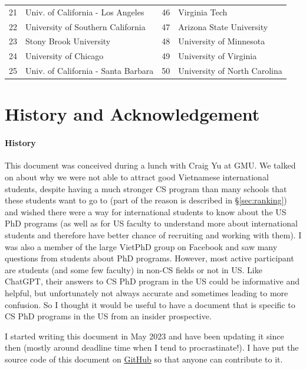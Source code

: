 \documentclass[11pt]{article}
\newcommand{\red}[1]{{\color{red}{#1}}}
\begin{document}
\begin{table}
\begin{tabular}{rl|rl}
    21 & Univ. of California - Los Angeles &46& Virginia Tech\red{$^*$}  \\
    22 & University of Southern California &47&  Arizona State University\red{$^*$} \\
    23 & Stony Brook University\red{$^*$} &48&University of Minnesota \\
    24 & University of Chicago &49& University of Virginia \\
    25 & Univ. of California - Santa Barbara &50& University of North Carolina\red{$^*$} \\
    \bottomrule
    \end{tabular}
\end{table}

\section{History and Acknowledgement}

\paragraph{History} This document was conceived during a lunch with Craig Yu at GMU.  We talked on about why we were not able to attract good Vietnamese international students, despite having a much stronger CS program than many schools that these students want to go to (part of the reason is described in \S\ref{sec:ranking}) and wished there were a way for international students to know about the US PhD programs (as well as for US faculty to understand more about international students and therefore have better chance of recruiting and working with them). I was also  a member of the large VietPhD group on Facebook and saw many questions from students about PhD programs.  However, most active participant are students (and some few faculty) in non-CS fields or not in US. Like ChatGPT, their answers to CS PhD program in the US could be informative and helpful, but unfortunately not always accurate and sometimes leading to more confusion. So I thought it would be useful to have a document that is specific to CS PhD programs in the US from an insider prospective.  

I started writing this document in May 2023 and have been updating it since then (mostly around deadline time when I tend to procrastinate!). I have put the source code of this document on \href{https://github.com/nguyenthanhvuh/phd-cs-us}{GitHub} so that anyone can contribute to it.  
\end{document}
